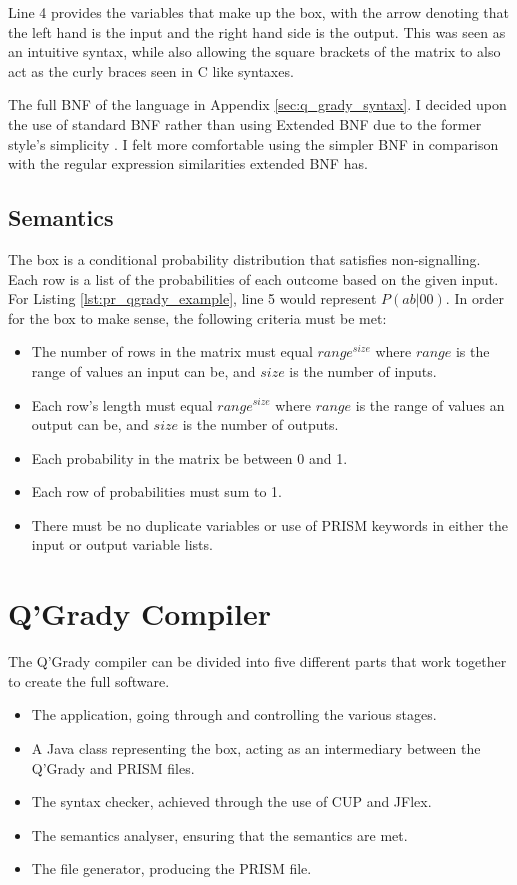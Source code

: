 \documentclass[report.tex]{subfiles}
\begin{document}
Line 4 provides the variables that make up the box, with the arrow denoting that
the left hand is the input and the right hand side is the output. This was seen
as an intuitive syntax, while also allowing the square brackets of the matrix to
also act as the curly braces seen in C like syntaxes.

The full BNF of the language in Appendix \ref{sec:q_grady_syntax}. I decided
upon the use of standard BNF rather than using Extended BNF due to the former
style's simplicity \cite[chapter 2.3.4, p.~38]{Watt:1991:PLS:120468}. I felt
more comfortable using the simpler BNF in comparison with the regular expression
similarities extended BNF has.

\subsection{Semantics} %
\label{sub:semantics}
The box is a conditional probability distribution that satisfies non-signalling.
Each row is a list of the probabilities of each outcome based on the given
input. For Listing \ref{lst:pr_qgrady_example}, line 5 would represent 
\(P(ab | 00)\). In order for the box to make sense, the following criteria must
be met:
\begin{itemize}
    \item The number of rows in the matrix must equal \(range ^ {size}\) where
    \(range\) is the range of values an input can be, and \(size\) is the number
    of inputs.
    \item Each row's length must equal \(range ^{size}\) where \(range\) is
    the range of values an output can be, and \(size\) is the number of outputs.
    \item Each probability in the matrix be between 0 and 1.
    \item Each row of probabilities must sum to 1.
    \item There must be no duplicate variables or use of PRISM keywords in
    either the input or output variable lists.
\end{itemize}


\section{Q'Grady Compiler} %
\label{sec:q_grady_compiler}
The Q'Grady compiler can be divided into five different parts that work
together to create the full software.
\begin{itemize}
    \item The application, going through and controlling the various stages.
    \item A Java class representing the box, acting as an intermediary
    between the Q'Grady and PRISM files.
    \item The syntax checker, achieved through the use of CUP and JFlex.
    \item The semantics analyser, ensuring that the semantics are met.
    \item The file generator, producing the PRISM file.
\end{itemize}
\end{document}
